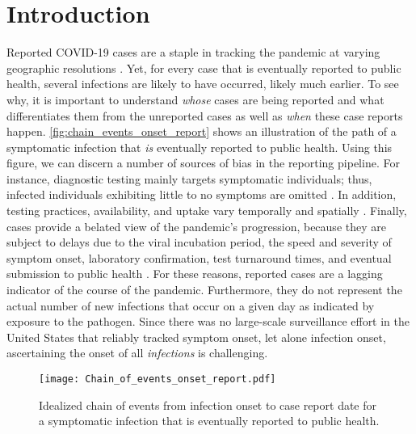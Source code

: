\section{Introduction}
\label{sec:intro}

Reported COVID-19 cases are a staple in tracking the pandemic at varying
geographic resolutions \citep{dong2020interactive, nyt2020corona,
wp2020tracking}. Yet, for every case that is eventually reported to public
health, several infections are likely to have occurred, likely much earlier. To
see why, it is important to understand \emph{whose} cases are being reported and
what differentiates them from the unreported cases as well as \emph{when} these
case reports happen. \autoref{fig:chain_events_onset_report} shows an
illustration of the path of a symptomatic infection that \emph{is} eventually
reported to public health. Using this figure, we can discern a number of sources
of bias in the reporting pipeline. For instance, diagnostic testing mainly
targets symptomatic individuals; thus, infected individuals exhibiting little to
no symptoms are omitted \citep{cdc2022estimated}. In addition, testing
practices, availability, and uptake vary temporally and spatially
\citep{pitzer2021impact, ecdc2020strategies, hitchings2021usefulness}. Finally,
cases provide a belated view of the pandemic's progression, because they are
subject to delays due to the viral incubation period, the speed and severity of
symptom onset, laboratory confirmation, test turnaround times, and eventual
submission to public health \citep{pellis2021challenges, wash2020dash}. For
these reasons, reported cases are a lagging indicator of the course of the
pandemic. Furthermore, they do not represent the actual number of new infections
that occur on a given day as indicated by exposure to the pathogen. Since there
was no large-scale surveillance effort in the United States that reliably
tracked symptom onset, let alone infection onset, ascertaining the onset of all
\emph{infections} is challenging.

\begin{figure}[!tb]
\centering
    \texttt{[image: Chain\_of\_events\_onset\_report.pdf]} 
    \caption{Idealized chain of events from infection onset to case report date 
    for a symptomatic infection that is eventually reported to public health.}
    \label{fig:chain_events_onset_report}
\end{figure}


